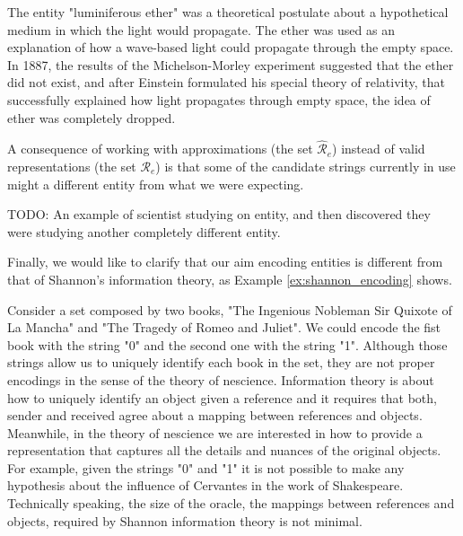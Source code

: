 \begin{example}
\label{ex:luminiferous_ether}
The entity "luminiferous ether" was a theoretical postulate about a hypothetical medium in which the light would propagate. The ether was used as an explanation of how a wave-based light could propagate through the empty space. In 1887, the results of the Michelson-Morley experiment suggested that the ether did not exist, and after Einstein formulated his special theory of relativity, that successfully explained how light propagates through empty space, the idea of ether was completely dropped.
\end{example}

A consequence of working with approximations (the set $\hat{\mathcal{R}}_e$) instead of valid representations (the set $\mathcal{R}_e$) is that some of the candidate strings currently in use might a different entity from what we were expecting.

\begin{example}
{\color{red} TODO: An example of scientist studying on entity, and then discovered they were studying another completely different entity.}
\end{example}

Finally, we would like to clarify that our aim encoding entities is different from that of Shannon's information theory, as Example \ref{ex:shannon_encoding} shows.

\begin{example}
\label{ex:shannon_encoding}
Consider a set composed by two books, "The Ingenious Nobleman Sir Quixote of La Mancha" and "The Tragedy of Romeo and Juliet". We could encode the fist book with the string "0" and the second one with the string "1". Although those strings allow us to uniquely identify each book in the set, they are not proper encodings in the sense of the theory of nescience. Information theory is about how to uniquely identify an object given a reference and it requires that both, sender and received agree about a mapping between references and objects. Meanwhile, in the theory of nescience we are interested in how to provide a representation that captures all the details and nuances of the original objects. For example, given the strings "0" and "1" it is not possible to make any hypothesis about the influence of Cervantes in the work of Shakespeare. Technically speaking, the size of the oracle, the mappings between references and objects, required by Shannon information theory is not minimal.
\end{example}

